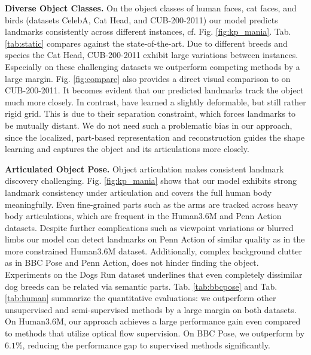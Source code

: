 	\textbf{Diverse Object Classes.}
	On the object classes of human faces, cat faces, and birds (datasets CelebA, Cat Head, and CUB-200-2011) our model predicts landmarks consistently across different instances, cf. Fig. \ref{fig:kp_mania}.
	Tab. \ref{tab:static} compares against the state-of-the-art. Due to different breeds and species the Cat Head, CUB-200-2011 exhibit large variations between instances. Especially on these challenging datasets we outperform competing methods by a large margin.
	Fig. \ref{fig:compare} also provides a direct visual comparison to \cite{Zhang:2018vz} on CUB-200-2011. It becomes evident that our predicted landmarks track the object much more closely. In contrast, \cite{Zhang:2018vz} have learned a slightly deformable, but still rather rigid grid.
	This is due to their separation constraint, which forces landmarks to be mutually distant. We do not need such a problematic bias in our approach, since the localized, part-based representation and reconstruction guides the shape learning and captures the object and its articulations more closely.
	


	\textbf{Articulated Object Pose.}
	Object articulation makes consistent landmark discovery challenging.
	Fig. \ref{fig:kp_mania} shows that our model exhibits strong landmark consistency under articulation and covers the full human body meaningfully.
	Even fine-grained parts such as the arms are tracked across heavy body articulations, which are frequent in the Human3.6M and Penn Action datasets.
    	Despite further complications such as viewpoint variations or blurred limbs our model can detect landmarks on Penn Action of similar quality as in the more constrained Human3.6M dataset.
	Additionally, complex background clutter as in BBC Pose and Penn Action, does not hinder finding the object.
	Experiments on the Dogs Run dataset underlines that even completely dissimilar dog breeds can be related via semantic parts.
	Tab. \ref{tab:bbcpose} and Tab. \ref{tab:human} summarize the quantitative evaluations: we outperform other unsupervised and semi-supervised methods by a large margin on both datasets.
	On Human3.6M, our approach achieves a large performance gain even compared to methods that utilize optical flow supervision.
	On BBC Pose, we outperform \cite{Jakab:2018wc} by $6.1\%$, reducing the performance gap to supervised methods significantly.
